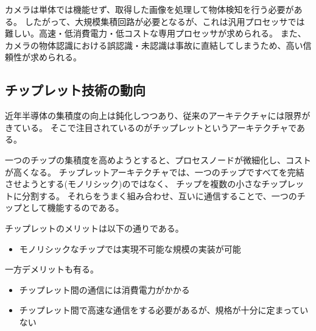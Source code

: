 カメラは単体では機能せず、取得した画像を処理して物体検知を行う必要がある。
したがって、大規模集積回路が必要となるが、これは汎用プロセッサでは難しい。高速・低消費電力・低コストな専用プロセッサが求められる。
また、カメラの物体認識における誤認識・未認識は事故に直結してしまうため、高い信頼性が求められる。\cite{YuKaerekutoronikusuwoQianYinKeninSuruBanDaoTiJiShu2017}

\subsection*{チップレット技術の動向}
近年半導体の集積度の向上は鈍化しつつあり、従来のアーキテクチャには限界がきている。
そこで注目されているのがチップレットというアーキテクチャである。

一つのチップの集積度を高めようとすると、プロセスノードが微細化し、コストが高くなる。
チップレットアーキテクチャでは、一つのチップですべてを完結させようとする(モノリシック)のではなく、
チップを複数の小さなチップレットに分割する。
それらをうまく組み合わせ、互いに通信することで、一つのチップとして機能するのである。\cite{YuShiTitupuretutonoGaiNianto3dIcnorapitudopurototaipingu2023}

チップレットのメリットは以下の通りである。
\begin{itemize}
    \item モノリシックなチップでは実現不可能な規模の実装が可能\cite{YiLangSinpurunatitupuJianburituziJieSokGouZao2022}
\end{itemize}
一方デメリットも有る。
\begin{itemize}
    \item チップレット間の通信には消費電力がかかる
    \item チップレット間で高速な通信をする必要があるが、規格が十分に定まっていない\cite{YuShiTitupuretutonoGaiNianto3dIcnorapitudopurototaipingu2023}
\end{itemize}